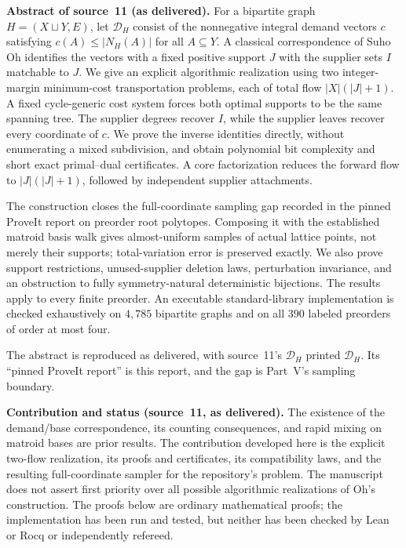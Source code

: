 \documentclass[11pt]{article}
\numberwithin{equation}{section}
\theoremstyle{definition}
\newcommand{\cD}{\mathcal D}
\begin{document}
\begin{tcolorbox}[colback=white,colframe=Pale,arc=1mm]
\small\textbf{Abstract of source~11 (as delivered).}
For a bipartite graph $H=(X\sqcup Y,E)$, let $\cD_H$ consist of the
nonnegative integral demand vectors $c$ satisfying
$c(A)\le |N_H(A)|$ for all $A\subseteq Y$. A classical correspondence of
Suho Oh identifies the vectors with a fixed positive support $J$ with the
supplier sets $I$ matchable to $J$. We give an explicit algorithmic
realization using two integer-margin minimum-cost transportation problems,
each of total flow $|X|(|J|+1)$. A fixed cycle-generic cost system forces
both optimal supports to be the same spanning tree. The supplier degrees
recover $I$, while the supplier leaves recover every coordinate of $c$.
We prove the inverse identities directly, without enumerating a mixed
subdivision, and obtain polynomial bit complexity and short exact
primal--dual certificates. A core factorization reduces the forward flow
to $|J|(|J|+1)$, followed by independent supplier attachments.

The construction closes the full-coordinate sampling gap recorded in the
pinned ProveIt report on preorder root polytopes. Composing it with the
established matroid basis walk gives almost-uniform samples of actual
lattice points, not merely their supports; total-variation error is
preserved exactly. We also prove support restrictions, unused-supplier
deletion laws, perturbation invariance, and an obstruction to fully
symmetry-natural deterministic bijections. The results apply to every
finite preorder. An executable standard-library implementation is checked
exhaustively on $4{,}785$ bipartite graphs and on all $390$ labeled
preorders of order at most four.
\end{tcolorbox}
\noindent The abstract is reproduced as delivered, with source~11's
$\mathcal D_H$ printed $\cD_H$. Its ``pinned ProveIt report'' is this
report, and the gap is Part~V's sampling boundary.

\begin{statusbox}
\small\textbf{Contribution and status (source~11, as delivered).} The
existence of the demand/base correspondence, its counting consequences,
and rapid mixing on matroid bases are prior results. The contribution
developed here is the explicit two-flow realization, its proofs and
certificates, its compatibility laws, and the resulting full-coordinate
sampler for the repository's problem. The manuscript does not assert
first priority over all possible algorithmic realizations of Oh's
construction. The proofs below are ordinary mathematical proofs; the
implementation has been run and tested, but neither has been checked by
Lean or Rocq or independently refereed.
\end{statusbox}
\end{document}
